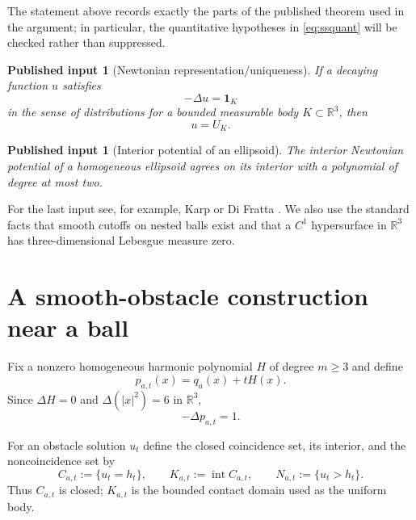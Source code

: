 \documentclass[11pt]{article}
\newtheorem{external}[theorem]{Published input}
\theoremstyle{definition}
\theoremstyle{remark}
\newcommand{\R}{\mathbb{R}}
\newcommand{\lap}{\Delta}
\newcommand{\1}{\mathbf{1}}
\begin{document}
The statement above records exactly the parts of the published theorem used in the argument; in particular, the quantitative hypotheses in \eqref{eq:ssquant} will be checked rather than suppressed.

\begin{external}[Newtonian representation/uniqueness]\label{ext:uniqueness}
If a decaying function $u$ satisfies
\[
 -\lap u=\1_K
\]
in the sense of distributions for a bounded measurable body $K\subset\R^3$, then
\[
 u=U_K.
\]
\end{external}

\begin{external}[Interior potential of an ellipsoid]\label{ext:ellipsoid}
The interior Newtonian potential of a homogeneous ellipsoid agrees on its interior with a polynomial of degree at most two.
\end{external}

For the last input see, for example, Karp \cite{Karp} or Di Fratta \cite{DiFratta}. We also use the standard facts that smooth cutoffs on nested balls exist and that a $C^1$ hypersurface in $\R^3$ has three-dimensional Lebesgue measure zero.

\section{A smooth-obstacle construction near a ball}

Fix a nonzero homogeneous harmonic polynomial $H$ of degree $m\ge3$ and define
\begin{equation}\label{eq:pat}
 p_{a,t}(x)=q_a(x)+tH(x).
\end{equation}
Since $\lap H=0$ and $\lap(|x|^2)=6$ in $\R^3$,
\begin{equation}\label{eq:lap-p}
 -\lap p_{a,t}=1.
\end{equation}

For an obstacle solution $u_t$ define the closed coincidence set, its interior, and the noncoincidence set by
\begin{equation}\label{eq:sets}
 C_{a,t}:=\{u_t=h_t\},\qquad
 K_{a,t}:=\operatorname{int}C_{a,t},\qquad
 N_{a,t}:=\{u_t>h_t\}.
\end{equation}
Thus $C_{a,t}$ is closed; $K_{a,t}$ is the bounded contact domain used as the uniform body.
\end{document}
